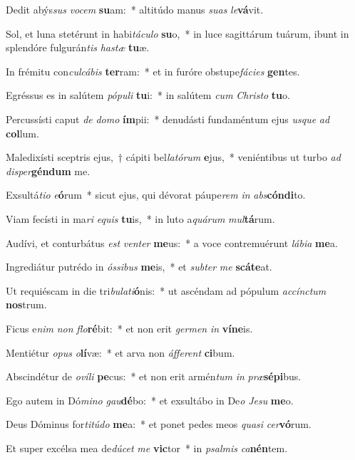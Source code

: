 \item Dedit abýs\textit{sus} \textit{vo}\textit{cem} \textbf{su}am:~* altitúdo manus \textit{su}\textit{as} \textit{le}\textbf{vá}vit.
\item Sol, et luna stetérunt in habi\textit{tá}\textit{cu}\textit{lo} \textbf{su}o,~* in luce sagittárum tuárum, ibunt in splendóre fulgurán\textit{tis} \textit{has}\textit{tæ} \textbf{tu}æ.
\item In frémitu con\textit{cul}\textit{cá}\textit{bis} \textbf{ter}ram:~* et in furóre obstupe\textit{fá}\textit{ci}\textit{es} \textbf{gen}tes.
\item Egréssus es in salútem \textit{pó}\textit{pu}\textit{li} \textbf{tu}i:~* in salútem \textit{cum} \textit{Chris}\textit{to} \textbf{tu}o.
\item Percussísti caput \textit{de} \textit{do}\textit{mo} \textbf{ím}pii:~* denudásti fundaméntum ejus \textit{us}\textit{que} \textit{ad} \textbf{col}lum.
\item Maledixísti sceptris ejus,~† cápiti bel\textit{la}\textit{tó}\textit{rum} \textbf{e}jus,~* veniéntibus ut turbo \textit{ad} \textit{di}\textit{sper}\textbf{gén}\textbf{dum} me.
\item Exsultá\textit{ti}\textit{o} \textit{e}\textbf{ó}rum~* sicut ejus, qui dévorat páupe\textit{rem} \textit{in} \textit{abs}\textbf{cón}\textbf{di}to.
\item Viam fecísti in ma\textit{ri} \textit{e}\textit{quis} \textbf{tu}is,~* in luto a\textit{quá}\textit{rum} \textit{mul}\textbf{tá}rum.
\item Audívi, et conturbátus \textit{est} \textit{ven}\textit{ter} \textbf{me}us:~* a voce contremuérunt \textit{lá}\textit{bi}\textit{a} \textbf{me}a.
\item Ingrediátur putrédo in \textit{ós}\textit{si}\textit{bus} \textbf{me}is,~* et \textit{sub}\textit{ter} \textit{me} \textbf{scá}\textbf{te}at.
\item Ut requiéscam in die tri\textit{bu}\textit{la}\textit{ti}\textbf{ó}nis:~* ut ascéndam ad pópulum \textit{ac}\textit{cínc}\textit{tum} \textbf{nos}trum.
\item Ficus e\textit{nim} \textit{non} \textit{flo}\textbf{ré}bit:~* et non erit \textit{ger}\textit{men} \textit{in} \textbf{ví}\textbf{ne}is.
\item Mentiétur \textit{o}\textit{pus} \textit{o}\textbf{lí}væ:~* et arva non \textit{áf}\textit{fe}\textit{rent} \textbf{ci}bum.
\item Abscindétur de \textit{o}\textit{ví}\textit{li} \textbf{pe}cus:~* et non erit armén\textit{tum} \textit{in} \textit{præ}\textbf{sé}\textbf{pi}bus.
\item Ego autem in Dó\textit{mi}\textit{no} \textit{gau}\textbf{dé}bo:~* et exsultábo in De\textit{o} \textit{Je}\textit{su} \textbf{me}o.
\item Deus Dóminus for\textit{ti}\textit{tú}\textit{do} \textbf{me}a:~* et ponet pedes meos \textit{qua}\textit{si} \textit{cer}\textbf{vó}rum.
\item Et super excélsa mea de\textit{dú}\textit{cet} \textit{me} \textbf{vic}tor~* in \textit{psal}\textit{mis} \textit{ca}\textbf{nén}tem.
